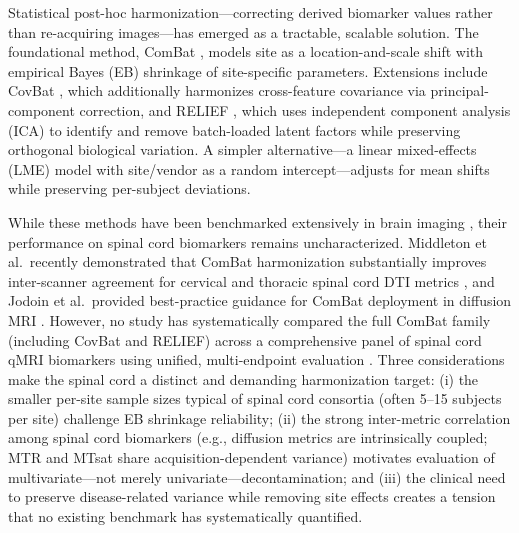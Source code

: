 \documentclass[12pt,a4paper]{article}
\begin{document}
Statistical post-hoc harmonization---correcting derived biomarker values rather than re-acquiring images---has emerged as a tractable, scalable solution. The foundational method, ComBat \cite{johnson2007adjusting,fortin2017harmonization}, models site as a location-and-scale shift with empirical Bayes (EB) shrinkage of site-specific parameters. Extensions include CovBat \cite{chen2022mitigating}, which additionally harmonizes cross-feature covariance via principal-component correction, and RELIEF \cite{zhang2023relief}, which uses independent component analysis (ICA) to identify and remove batch-loaded latent factors while preserving orthogonal biological variation. A simpler alternative---a linear mixed-effects (LME) model with site/vendor as a random intercept---adjusts for mean shifts while preserving per-subject deviations.

While these methods have been benchmarked extensively in brain imaging \cite{fortin2018harmonization,tax2019cross,bayer2022site}, their performance on spinal cord biomarkers remains uncharacterized. Middleton et al.\ recently demonstrated that ComBat harmonization substantially improves inter-scanner agreement for cervical and thoracic spinal cord DTI metrics \cite{middleton2023spinal}, and Jodoin et al.\ provided best-practice guidance for ComBat deployment in diffusion MRI \cite{jodoin2025combat}. However, no study has systematically compared the full ComBat family (including CovBat and RELIEF) across a comprehensive panel of spinal cord qMRI biomarkers using unified, multi-endpoint evaluation \cite{destefano2022magnims}. Three considerations make the spinal cord a distinct and demanding harmonization target: (i) the smaller per-site sample sizes typical of spinal cord consortia (often 5--15 subjects per site) challenge EB shrinkage reliability; (ii) the strong inter-metric correlation among spinal cord biomarkers (e.g., diffusion metrics are intrinsically coupled; MTR and MTsat share acquisition-dependent variance) motivates evaluation of multivariate---not merely univariate---decontamination; and (iii) the clinical need to preserve disease-related variance while removing site effects creates a tension that no existing benchmark has systematically quantified.
\end{document}
